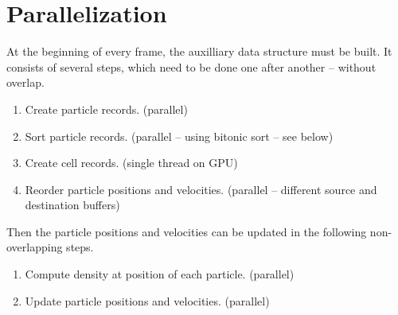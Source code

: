 \documentclass[a4paper,report]{IEEEtran}
\newcounter{kernelCounter}
\begin{document}
\section{Parallelization}
\label{sec:parallelization}
At the beginning of every frame, the auxilliary data structure must be built. It consists of several steps, which need to be done one after another -- without overlap.
\begin{enumerate}
	\item Create particle records. (parallel)
	\item Sort particle records. (parallel -- using bitonic sort -- see below)
	\item Create cell records. (single thread on GPU)
	\item Reorder particle positions and velocities. (parallel -- different source and destination buffers)
	\setcounter{kernelCounter}{\value{enumi}}
\end{enumerate}
Then the particle positions and velocities can be updated in the following non-overlapping steps.
\begin{enumerate}
	\setcounter{enumi}{\value{kernelCounter}}
	\item Compute density at position of each particle. (parallel)
	\item Update particle positions and velocities. (parallel)
\end{enumerate}
\end{document}
